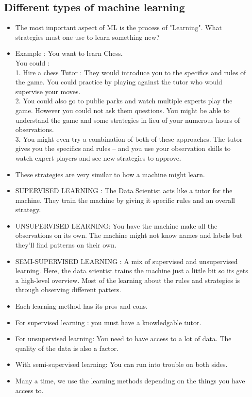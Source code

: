 \documentclass[11pt, oneside]{article}   	%
\begin{document}
\subsection{Different types of machine learning}
\begin{itemize}
\item The most important aspect of ML is the process of "Learning". What strategies must one use to learn something new? 
\item Example : You want to learn Chess. \\
You could :\\ 
1. Hire a chess Tutor : They would introduce you to the specifics and rules of the game. You could practice by playing against the tutor who would supervise your moves. \\
2. You could also go to public parks and watch multiple experts play the game. However you could not ask them questions. You might be able to understand the game and some strategies in lieu of your numerous hours of observations.\\
3. You might even try a combination of both of these approaches. The tutor gives you the specifics and rules -- and you use your observation skills to watch expert players and see new strategies to approve.
\item These strategies are very similar to how a machine might learn.
\item SUPERVISED LEARNING : The Data Scientist acts like a tutor for the machine. They train the machine by giving it specific rules and an overall strategy.
\item UNSUPERVISED LEARNING: You have the machine make all the observations on its own. The machine might not know names and labels but they'll find patterns on their own.
\item SEMI-SUPERVISED LEARNING : A mix of supervised and unsupervised learning. Here, the data scientist trains the machine just a little bit so its gets a high-level overview. Most of the learning about the rules and strategies is through observing different patters.
\item Each learning method has its pros and cons.
\item For supervised learning : you must have a knowledgable tutor.
\item For unsupervised learning: You need to have access to a lot of data. The quality of the data is also a factor.
\item With semi-supervised learning: You can run into trouble on both sides.
\item Many a time, we use the learning methods depending on the things you have access to.
\end{itemize}
\end{document}
